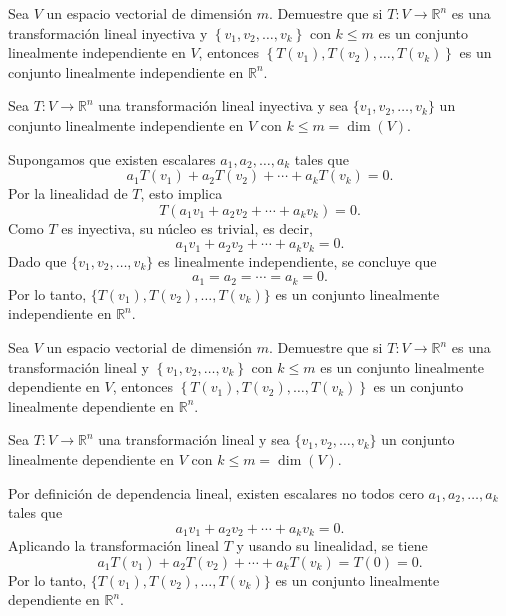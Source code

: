\begin{prob}
Sea $V$ un espacio vectorial de dimensión $m$. Demuestre que si $T:V\rightarrow \mathbb{R}^n$ es una transformación lineal inyectiva y $\left\lbrace v_1,v_2,\dots , v_k \right\rbrace$ con $k\leq m$ es un conjunto linealmente independiente en $V$, entonces $\left\lbrace T(v_1), T(v_2), \dots , T(v_k)  \right\rbrace$ es un conjunto linealmente independiente en $\mathbb{R}^n$.
\begin{myproof}
Sea $T: V \to \mathbb{R}^n$ una transformación lineal inyectiva y sea $\{v_1, v_2, \dots, v_k\}$ un conjunto linealmente independiente en $V$ con $k \leq m = \dim(V)$.

Supongamos que existen escalares $a_1, a_2, \dots, a_k$ tales que
\[
    a_1 T(v_1) + a_2 T(v_2) + \cdots + a_k T(v_k) = 0.
\]
Por la linealidad de $T$, esto implica
\[
    T(a_1 v_1 + a_2 v_2 + \cdots + a_k v_k) = 0.
\]
Como $T$ es inyectiva, su núcleo es trivial, es decir,
\[
    a_1 v_1 + a_2 v_2 + \cdots + a_k v_k = 0.
\]
Dado que $\{v_1, v_2, \dots, v_k\}$ es linealmente independiente, se concluye que
\[
    a_1 = a_2 = \cdots = a_k = 0.
\]
Por lo tanto, $\{T(v_1), T(v_2), \dots, T(v_k)\}$ es un conjunto linealmente independiente en $\mathbb{R}^n$.
\end{myproof}
\end{prob}

\begin{prob}
Sea $V$ un espacio vectorial de dimensión $m$. Demuestre que si $T:V\rightarrow \mathbb{R}^n$ es una transformación lineal y $\left\lbrace v_1,v_2,\dots , v_k \right\rbrace$ con $k\leq m$ es un conjunto linealmente dependiente en $V$, entonces $\left\lbrace T(v_1), T(v_2), \dots , T(v_k)  \right\rbrace$ es un conjunto linealmente dependiente en $\mathbb{R}^n$.
\begin{myproof}
Sea $T: V \to \mathbb{R}^n$ una transformación lineal y sea $\{v_1, v_2, \dots, v_k\}$ un conjunto linealmente dependiente en $V$ con $k \leq m = \dim(V)$.

Por definición de dependencia lineal, existen escalares no todos cero $a_1, a_2, \dots, a_k$ tales que
\[
    a_1 v_1 + a_2 v_2 + \cdots + a_k v_k = 0.
\]
Aplicando la transformación lineal $T$ y usando su linealidad, se tiene
\[
    a_1 T(v_1) + a_2 T(v_2) + \cdots + a_k T(v_k) = T(0) = 0.
\]
Por lo tanto, $\{T(v_1), T(v_2), \dots, T(v_k)\}$ es un conjunto linealmente dependiente en $\mathbb{R}^n$.
\end{myproof}
\end{prob}





